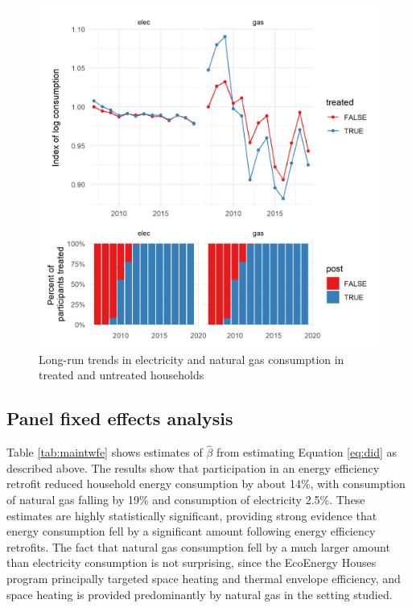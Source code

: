 \documentclass{article}
\begin{document}
\begin{figure}
	\includegraphics{../output_figures_tables/aggregate_trend_graph}
	\caption{Long-run trends in electricity and natural gas consumption in treated and untreated households}\label{fig_agg}
\end{figure}



\subsection{Panel fixed effects analysis}
Table \ref{tab:maintwfe} shows estimates of $\hat{\beta}$ from estimating Equation \eqref{eq:did} as described above. The results show that participation in an energy efficiency retrofit reduced household energy consumption by about 14\%, with consumption of natural gas falling by 19\% and consumption of electricity 2.5\%. These estimates are highly statistically significant, providing strong evidence that energy consumption fell by a significant amount following energy efficiency retrofits. The fact that natural gas consumption fell by a much larger amount than electricity consumption is not surprising, since the EcoEnergy Houses program principally targeted space heating and thermal envelope efficiency, and space heating is provided predominantly by natural gas in the setting studied.  
\end{document}
